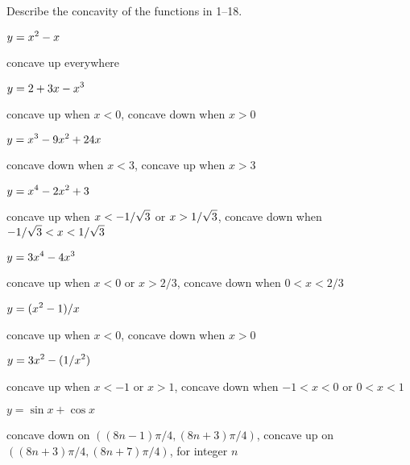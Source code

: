\begin{exercises}
Describe the concavity of the functions in 1--18.

\twocol

\begin{exercise} $\displaystyle y=x^2-x$ 
\begin{answer} concave up everywhere
\end{answer}\end{exercise}

\begin{exercise} $\displaystyle y=2+3x-x^3$ 
\begin{answer} concave up when $x<0$, concave down when $x>0$
\end{answer}\end{exercise}

\begin{exercise} $\displaystyle y=x^3-9x^2+24x$
\begin{answer} concave down when $x<3$, concave up when $x>3$
\end{answer}\end{exercise}

\begin{exercise} $\displaystyle y=x^4-2x^2+3$ 
\begin{answer} concave up when $\displaystyle x<-1/\sqrt3$ or $\displaystyle x>1/\sqrt3$,
concave down when $\displaystyle -1/\sqrt3<x<1/\sqrt3$
\end{answer}\end{exercise}

\begin{exercise} $\displaystyle y=3x^4-4x^3$
\begin{answer} concave up when $x<0$ or $x>2/3$,
concave down when $0<x<2/3$
\end{answer}\end{exercise}

\begin{exercise} $\displaystyle y=(x^2-1)/x$
\begin{answer} concave up when $x<0$, concave down when $x>0$
\end{answer}\end{exercise}

\begin{exercise} $\displaystyle y=3x^2-(1/x^2)$ 
\begin{answer} concave up when $x<-1$ or $x>1$, concave down when
$-1<x<0$ or $0<x<1$
\end{answer}\end{exercise}

\begin{exercise} $y=\sin x + \cos x$ 
\begin{answer} concave down on $((8n-1)\pi/4,(8n+3)\pi/4)$,
concave up on $((8n+3)\pi/4,(8n+7)\pi/4)$, for integer $n$
\end{answer}\end{exercise}


\end{exercises}

